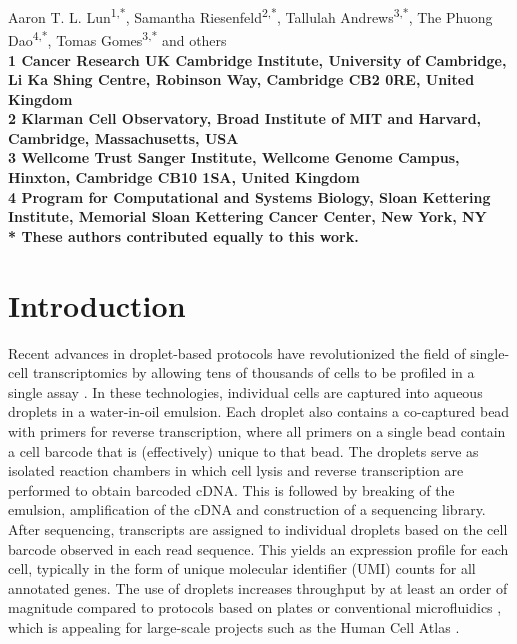 \documentclass[10pt,letterpaper]{article}
\begin{document}
\vspace*{0.35in}

\begin{flushleft}
{\Large
    \textbf{}
}
\newline

Aaron T. L. Lun\textsuperscript{1,*},
Samantha Riesenfeld\textsuperscript{2,*},
Tallulah Andrews\textsuperscript{3,*},
The Phuong Dao\textsuperscript{4,*},
Tomas Gomes\textsuperscript{3,*}
and others
\\
\bigskip
\bf{1} Cancer Research UK Cambridge Institute, University of Cambridge, Li Ka Shing Centre, Robinson Way, Cambridge CB2 0RE, United Kingdom \\
\bf{2} Klarman Cell Observatory, Broad Institute of MIT and Harvard, Cambridge, Massachusetts, USA \\
\bf{3} Wellcome Trust Sanger Institute, Wellcome Genome Campus, Hinxton, Cambridge CB10 1SA, United Kingdom \\
\bf{4} Program for Computational and Systems Biology, Sloan Kettering Institute, Memorial Sloan Kettering Cancer Center, New York, NY
\\
\bigskip
* These authors contributed equally to this work.

\end{flushleft}

\section*{Introduction}
Recent advances in droplet-based protocols have revolutionized the field of single-cell transcriptomics by allowing tens of thousands of cells to be profiled in a single assay \cite{macosko2015highly,klein2015droplet,zheng2017massively}.
In these technologies, individual cells are captured into aqueous droplets in a water-in-oil emulsion.
Each droplet also contains a co-captured bead with primers for reverse transcription, where all primers on a single bead contain a cell barcode that is (effectively) unique to that bead.
The droplets serve as isolated reaction chambers in which cell lysis and reverse transcription are performed to obtain barcoded cDNA.
This is followed by breaking of the emulsion, amplification of the cDNA and construction of a sequencing library.
After sequencing, transcripts are assigned to individual droplets based on the cell barcode observed in each read sequence.
This yields an expression profile for each cell, typically in the form of unique molecular identifier (UMI) counts \cite{islam2014quantitative} for all annotated genes. 
The use of droplets increases throughput by at least an order of magnitude compared to protocols based on plates \cite{picelli2013smartseq2} or conventional microfluidics \cite{pollen2014low}, which is appealing for large-scale projects such as the Human Cell Atlas \cite{regev2017human}.
\end{document}
